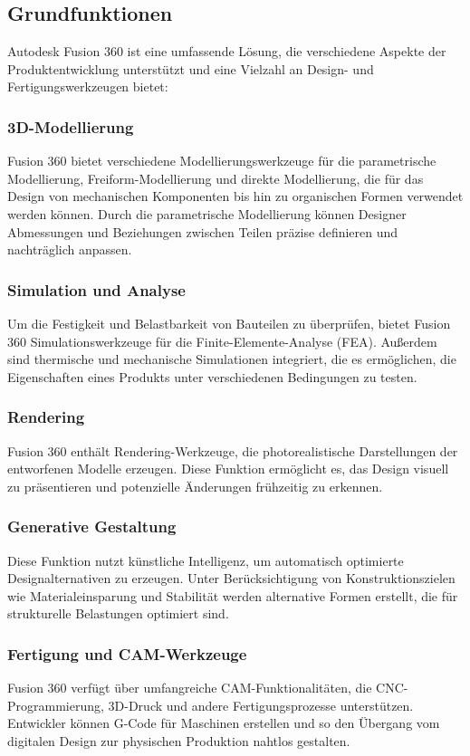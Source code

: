 \subsection{Grundfunktionen}
Autodesk Fusion 360 ist eine umfassende Lösung, die verschiedene Aspekte der Produktentwicklung unterstützt und eine Vielzahl an Design- und Fertigungswerkzeugen bietet:
\subsubsection*{3D-Modellierung }
Fusion 360 bietet verschiedene Modellierungswerkzeuge für die parametrische Modellierung, Freiform-Modellierung und direkte Modellierung, die für das Design von mechanischen Komponenten bis hin zu organischen Formen verwendet werden können. Durch die parametrische Modellierung können Designer Abmessungen und Beziehungen zwischen Teilen präzise definieren und nachträglich anpassen.\autocite{autodesk_fusion360_features}
\subsubsection*{Simulation und Analyse}
Um die Festigkeit und Belastbarkeit von Bauteilen zu überprüfen, bietet Fusion 360 Simulationswerkzeuge für die Finite-Elemente-Analyse (FEA). Außerdem sind thermische und mechanische Simulationen integriert, die es ermöglichen, die Eigenschaften eines Produkts unter verschiedenen Bedingungen zu testen.\autocite{autodesk_what_is_fusion360}
\subsubsection*{Rendering}
Fusion 360 enthält Rendering-Werkzeuge, die photorealistische Darstellungen der entworfenen Modelle erzeugen. Diese Funktion ermöglicht es, das Design visuell zu präsentieren und potenzielle Änderungen frühzeitig zu erkennen.\autocite{autodesk_fusion360_lessons}
\subsubsection*{Generative Gestaltung}
Diese Funktion nutzt künstliche Intelligenz, um automatisch optimierte Designalternativen zu erzeugen. Unter Berücksichtigung von Konstruktionszielen wie Materialeinsparung und Stabilität werden alternative Formen erstellt, die für strukturelle Belastungen optimiert sind.\autocite{cideon_fusion360_vorteile}
\subsubsection*{Fertigung und CAM-Werkzeuge}
Fusion 360 verfügt über umfangreiche CAM-Funktionalitäten, die CNC-Programmierung, 3D-Druck und andere Fertigungsprozesse unterstützen. Entwickler können G-Code für Maschinen erstellen und so den Übergang vom digitalen Design zur physischen Produktion nahtlos gestalten.\autocite{autodesk_fusion360_lessons}
